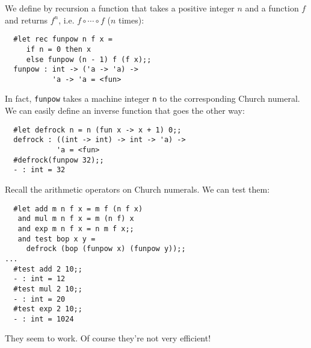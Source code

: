 \begin{slide*}


\vspace*{0.5cm}

We define by recursion a function that takes a positive integer {\red $n$}
and a function {\red $f$} and returns {\red $f^n$}, i.e. {\red $f \circ \cdots
\circ f$} ({\red $n$} times):

\begin{black}\begin{verbatim}
  #let rec funpow n f x =
     if n = 0 then x
     else funpow (n - 1) f (f x);;
  funpow : int -> ('a -> 'a) ->
           'a -> 'a = <fun>
\end{verbatim}\end{black}

In fact, {\black \tt funpow} takes a machine integer {\black \tt n} to the
corresponding Church numeral. We can easily define an inverse function that
goes the other way:

\begin{black}\begin{verbatim}
  #let defrock n = n (fun x -> x + 1) 0;;
  defrock : ((int -> int) -> int -> 'a) ->
            'a = <fun>
  #defrock(funpow 32);;
  - : int = 32
\end{verbatim}\end{black}

\end{slide*}



\begin{slide*}


\vspace*{0.5cm}

Recall the arithmetic operators on Church numerals. We can test them:

\begin{black}\begin{verbatim}
  #let add m n f x = m f (n f x)
   and mul m n f x = m (n f) x
   and exp m n f x = n m f x;;
   and test bop x y =
     defrock (bop (funpow x) (funpow y));;
...
  #test add 2 10;;
  - : int = 12
  #test mul 2 10;;
  - : int = 20
  #test exp 2 10;;
  - : int = 1024
\end{verbatim}\end{black}

They seem to work. Of course they're not very efficient!

\end{slide*}



